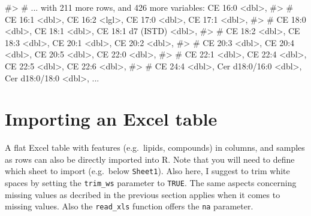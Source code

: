 \documentclass[
  letterpaper,
  DIV=11,
  numbers=noendperiod]{scrreprt}
\newenvironment{Shaded}{\begin{snugshade}}{\end{snugshade}}
\newcommand{\CommentTok}[1]{\textcolor[rgb]{0.37,0.37,0.37}{#1}}
\begin{document}
\begin{Shaded}
\begin{Highlighting}[]
\CommentTok{\#\textgreater{} \# ... with 211 more rows, and 426 more variables: \textasciigrave{}CE 16:0\textasciigrave{} \textless{}dbl\textgreater{},}
\CommentTok{\#\textgreater{} \#   \textasciigrave{}CE 16:1\textasciigrave{} \textless{}dbl\textgreater{}, \textasciigrave{}CE 16:2\textasciigrave{} \textless{}lgl\textgreater{}, \textasciigrave{}CE 17:0\textasciigrave{} \textless{}dbl\textgreater{}, \textasciigrave{}CE 17:1\textasciigrave{} \textless{}dbl\textgreater{},}
\CommentTok{\#\textgreater{} \#   \textasciigrave{}CE 18:0\textasciigrave{} \textless{}dbl\textgreater{}, \textasciigrave{}CE 18:1\textasciigrave{} \textless{}dbl\textgreater{}, \textasciigrave{}CE 18:1 d7 (ISTD)\textasciigrave{} \textless{}dbl\textgreater{},}
\CommentTok{\#\textgreater{} \#   \textasciigrave{}CE 18:2\textasciigrave{} \textless{}dbl\textgreater{}, \textasciigrave{}CE 18:3\textasciigrave{} \textless{}dbl\textgreater{}, \textasciigrave{}CE 20:1\textasciigrave{} \textless{}dbl\textgreater{}, \textasciigrave{}CE 20:2\textasciigrave{} \textless{}dbl\textgreater{},}
\CommentTok{\#\textgreater{} \#   \textasciigrave{}CE 20:3\textasciigrave{} \textless{}dbl\textgreater{}, \textasciigrave{}CE 20:4\textasciigrave{} \textless{}dbl\textgreater{}, \textasciigrave{}CE 20:5\textasciigrave{} \textless{}dbl\textgreater{}, \textasciigrave{}CE 22:0\textasciigrave{} \textless{}dbl\textgreater{},}
\CommentTok{\#\textgreater{} \#   \textasciigrave{}CE 22:1\textasciigrave{} \textless{}dbl\textgreater{}, \textasciigrave{}CE 22:4\textasciigrave{} \textless{}dbl\textgreater{}, \textasciigrave{}CE 22:5\textasciigrave{} \textless{}dbl\textgreater{}, \textasciigrave{}CE 22:6\textasciigrave{} \textless{}dbl\textgreater{},}
\CommentTok{\#\textgreater{} \#   \textasciigrave{}CE 24:4\textasciigrave{} \textless{}dbl\textgreater{}, \textasciigrave{}Cer d18:0/16:0\textasciigrave{} \textless{}dbl\textgreater{}, \textasciigrave{}Cer d18:0/18:0\textasciigrave{} \textless{}dbl\textgreater{}, ...}
\end{Highlighting}
\end{Shaded}

\hypertarget{importing-an-excel-table}{%
\section{Importing an Excel table}\label{importing-an-excel-table}}

A flat Excel table with features (e.g.~lipids, compounds) in columns,
and samples as rows can also be directly imported into R. Note that you
will need to define which sheet to import (e.g.~below \texttt{Sheet1}).
Also here, I suggest to trim white spaces by setting the
\texttt{trim\_ws} parameter to \texttt{TRUE}. The same aspects
concerning missing values as decribed in the previous section applies
when it comes to missing values. Also the \texttt{read\_xls} function
offers the \texttt{na} parameter.
\end{document}
